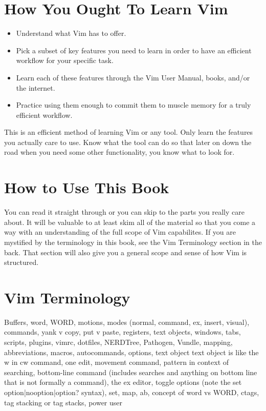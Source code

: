 \documentclass[12pt]{book}
\begin{document}
\section{How You Ought To Learn Vim}
\begin{itemize}
\item Understand what Vim has to offer.
\item Pick a subset of key features you need to learn in order to have an efficient workflow for your specific task.
\item Learn each of these features through the Vim User Manual, books, and/or the internet.
\item Practice using them enough to commit them to muscle memory for a truly efficient workflow. 
\end{itemize}
This is an efficient method of learning Vim or any tool. 
Only learn the features you actually care to use. 
Know what the tool can do so that later on down the road when you need some other functionality, you know what to look for.

\section{How to Use This Book}
You can read it straight through or you can skip to the parts you really care about.  
It will be valuable to at least skim all of the material so that you come a way with an understanding of the full scope of Vim capabilites.
If you are mystified by the terminology in this book, see the Vim Terminology section in the back.
That section will also give you a general scope and sense of how Vim is structured.

\section{Vim Terminology}
Buffers, word, WORD, motions, modes (normal, command, ex, insert, visual), commands, yank v copy, put v paste, registers, text objects, windows, tabs, scripts, plugins, vimrc, dotfiles,
NERDTree, Pathogen, Vundle, mapping, abbreviations, macros, autocommands, options, text object text object is like the w in cw command, one edit, movement command, pattern in context of 
searching, bottom-line command (includes searches and anything on bottom line that is not formally a command), the ex editor, toggle options (note the set option|nooption|option? syntax), 
set, map, ab, concept of word vs WORD, ctags, tag stacking or tag stacks, power user
\end{document}
